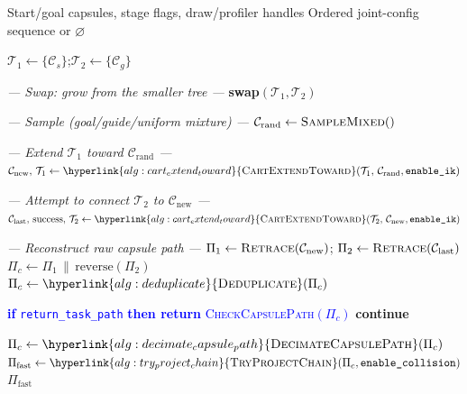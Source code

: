 \documentclass[11pt]{article}
\newcommand{\Continue}{\State \textbf{continue}}
\newcommand{\chg}[1]{\textcolor{blue}{#1}}
\newcommand{\AlgLink}[2]{\hyperlink{#1}{#2}}
\begin{document}
\begin{algorithm}[H]
\caption{\textsc{RRTConnectCapsule}($\mathcal{C}_s,\, \mathcal{C}_g$)}
\begin{algorithmic}[1]
\Require Start/goal capsules, stage flags, draw/profiler handles
\Ensure  Ordered joint-config sequence or $\varnothing$

\State $\mathcal{T}_1 \gets \{\mathcal{C}_s\}$;\quad $\mathcal{T}_2 \gets \{\mathcal{C}_g\}$


  \Statex \quad\textit{--- Swap: grow from the smaller tree ---}
   \textbf{swap}$(\mathcal{T}_1, \mathcal{T}_2)$ \EndIf

  \Statex \quad\textit{--- Sample (goal/guide/uniform mixture) ---}
  \State \chg{$\mathcal{C}_{\text{rand}} \gets \textsc{SampleMixed}()$}

  \Statex \quad\textit{--- Extend $\mathcal{T}_1$ toward $\mathcal{C}_{\text{rand}}$ ---}
  \State $\mathcal{C}_{\text{new}},\,\mathcal{T}_1 \gets \AlgLink{alg:cart_extend_toward}{\textsc{CartExtendToward}}(\mathcal{T}_1,\, \mathcal{C}_{\text{rand}},\texttt{enable\_ik})$

  \Statex \quad\textit{--- Attempt to connect $\mathcal{T}_2$ to $\mathcal{C}_{\text{new}}$ ---}
  \State $\mathcal{C}_{\text{last}},\,\text{success},\,\mathcal{T}_2 \gets \AlgLink{alg:cart_extend_toward}{\textsc{CartExtendToward}}(\mathcal{T}_2,\, \mathcal{C}_{\text{new}},\texttt{enable\_ik})$


    \Statex \quad\quad\textit{--- Reconstruct raw capsule path ---}
    \State $\Pi_1 \gets \textsc{Retrace}(\mathcal{C}_{\text{new}})$;\quad
           $\Pi_2 \gets \textsc{Retrace}(\mathcal{C}_{\text{last}})$
    \State $\Pi_c \gets \Pi_1 \,\|\, \text{reverse}(\Pi_2)$
    \State $\Pi_c \gets \AlgLink{alg:deduplicate}{\textsc{Deduplicate}}(\Pi_c)$
    \quad{}

      \State \chg{\textbf{if} \texttt{return\_task\_path} \textbf{then return} \textsc{CheckCapsulePath}$(\Pi_c)$}
      \Continue
    \EndIf

    \State \chg{$\Pi_c \gets \AlgLink{alg:decimate_capsule_path}{\textsc{DecimateCapsulePath}}(\Pi_c)$}
    \State \chg{$\Pi_{\text{fast}} \gets \AlgLink{alg:try_project_chain}{\textsc{TryProjectChain}}(\Pi_c,\texttt{enable\_collision})$}
     \Return $\Pi_{\text{fast}}$ \EndIf


\end{algorithmic}
\end{algorithm}
\end{document}
